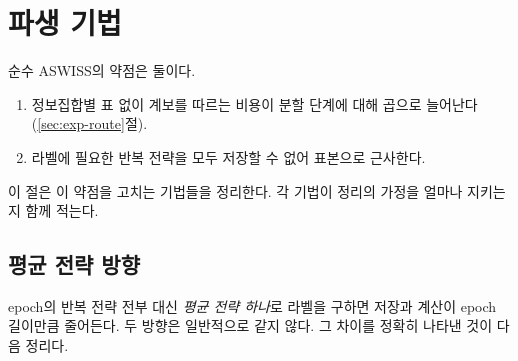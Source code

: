 \section{파생 기법}\label{sec:derived}

순수 ASWISS의 약점은 둘이다.
\begin{enumerate}
  \item 정보집합별 표 없이 계보를 따르는 비용이 분할 단계에 대해 곱으로 늘어난다(\ref{sec:exp-route}절).
  \item 라벨에 필요한 반복 전략을 모두 저장할 수 없어 표본으로 근사한다.
\end{enumerate}
이 절은 이 약점을 고치는 기법들을 정리한다. 각 기법이 정리의 가정을 얼마나 지키는지 함께 적는다.

\subsection{평균 전략 방향}\label{sec:derived-avg}
epoch의 반복 전략 전부 대신 \emph{평균 전략 하나}로 라벨을 구하면 저장과 계산이 epoch 길이만큼 줄어든다.
두 방향은 일반적으로 같지 않다. 그 차이를 정확히 나타낸 것이 다음 정리다.

